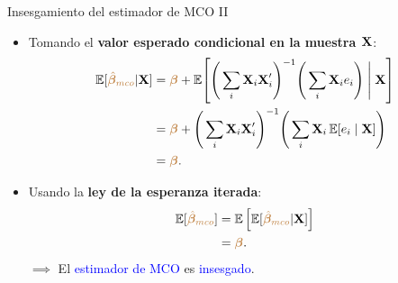 \documentclass[10pt, xcolor=dvipsnames]{beamer}
\begin{document}
\begin{frame}{Insesgamiento del estimador de MCO II}
\begin{itemize}
    \item Tomando el \textbf{valor esperado condicional en la muestra \(\textbf{X}\)}:
    \begin{align*}
        \operatorname{\mathbb{E}}[\textcolor{brown}{\hat{\boldsymbol{\beta}}_{mco}}|\textbf{X}] 
        &= \textcolor{brown}{\boldsymbol{\beta}} 
           + \operatorname{\mathbb{E}}\!\left[ 
             \Bigg(\sum_i \textbf{X}_i \textbf{X}'_i \Bigg)^{-1} 
             \Bigg(\sum_i \textbf{X}_i e_i\Bigg) \;\Bigg|\; \textbf{X}
             \right] \\
        &= \textcolor{brown}{\boldsymbol{\beta}} 
           + \Bigg(\sum_i \textbf{X}_i \textbf{X}'_i \Bigg)^{-1} 
             \Bigg(\sum_i \textbf{X}_i \operatorname{\mathbb{E}}[e_i \mid \textbf{X}]\Bigg) \\
        &= \textcolor{brown}{\boldsymbol{\beta}}.
    \end{align*}
    \item Usando la \textbf{ley de la esperanza iterada}:
    \begin{align*}
        \operatorname{\mathbb{E}}[\textcolor{brown}{\hat{\boldsymbol{\beta}}_{mco}}] &= \operatorname{\mathbb{E}}\left[\operatorname{\mathbb{E}}[\textcolor{brown}{\hat{\boldsymbol{\beta}}_{mco}}|\textbf{X}]\right] \\
        &= \textcolor{brown}{\boldsymbol{\beta}}.
    \end{align*}
    $\implies$ El \textcolor{blue}{estimador de MCO} es \textcolor{blue}{insesgado}.
\end{itemize}
\end{frame}
\end{document}
